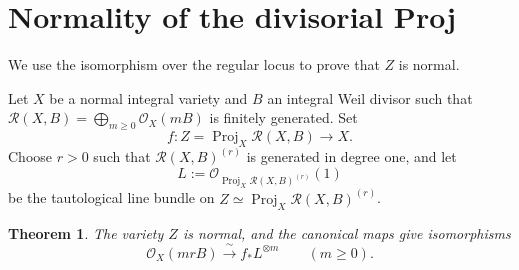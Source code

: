 \documentclass[11pt,a4paper]{article}
\newtheorem{theorem}[lemma]{Theorem}
\theoremstyle{definition}
\theoremstyle{definition}
\DeclareMathOperator{\Proj}{Proj}
\newcommand{\OO}{\mathcal O}
\newcommand{\RR}{\mathcal R}
\begin{document}
\section{Normality of the divisorial Proj}

We use the isomorphism over the regular locus to prove that $Z$ is normal.

Let $X$ be a normal integral variety and $B$ an integral Weil divisor such that $\RR(X,B)=\bigoplus_{m\ge0}\OO_X(mB)$ is finitely generated. Set
\[
 f\colon Z=\Proj_X\RR(X,B)\longrightarrow X.
\]
Choose $r>0$ such that $\RR(X,B)^{(r)}$ is generated in degree one, and let
\[
 L:=\OO_{\Proj_X\RR(X,B)^{(r)}}(1)
\]
be the tautological line bundle on $Z\simeq\Proj_X\RR(X,B)^{(r)}$.

\begin{theorem}\label{prop:normality}
The variety $Z$ is normal, and the canonical maps give isomorphisms
\[
 \OO_X(mrB)\xrightarrow{\ \sim\ }f_*L^{\otimes m}
 \qquad(m\ge0).
\]
\end{theorem}
\end{document}
